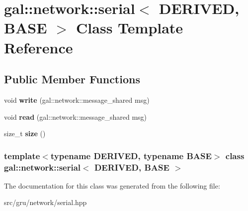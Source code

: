 \hypertarget{classgal_1_1network_1_1serial}{\section{gal\-:\-:network\-:\-:serial$<$ \-D\-E\-R\-I\-V\-E\-D, \-B\-A\-S\-E $>$ \-Class \-Template \-Reference}
\label{classgal_1_1network_1_1serial}
}
\subsection*{\-Public \-Member \-Functions}
\begin{DoxyCompactItemize}
\item 
\hypertarget{classgal_1_1network_1_1serial_ab4049343e023fb2e57e8bc4fee306300}{void {\bfseries write} (gal\-::network\-::message\-\_\-shared msg)}\label{classgal_1_1network_1_1serial_ab4049343e023fb2e57e8bc4fee306300}

\item 
\hypertarget{classgal_1_1network_1_1serial_a9b2c7927aff4750ab8be49f7849aa736}{void {\bfseries read} (gal\-::network\-::message\-\_\-shared msg)}\label{classgal_1_1network_1_1serial_a9b2c7927aff4750ab8be49f7849aa736}

\item 
\hypertarget{classgal_1_1network_1_1serial_a933ac0cf62f984b824549498c99c4cc1}{size\-\_\-t {\bfseries size} ()}\label{classgal_1_1network_1_1serial_a933ac0cf62f984b824549498c99c4cc1}

\end{DoxyCompactItemize}
\subsubsection*{template$<$typename \-D\-E\-R\-I\-V\-E\-D, typename \-B\-A\-S\-E$>$ class gal\-::network\-::serial$<$ D\-E\-R\-I\-V\-E\-D, B\-A\-S\-E $>$}



\-The documentation for this class was generated from the following file\-:\begin{DoxyCompactItemize}
\item 
src/gru/network/serial.\-hpp\end{DoxyCompactItemize}
